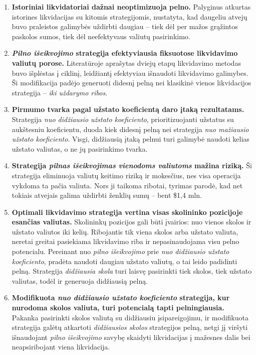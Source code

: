 \documentclass[]{VUMIFTemplateClass}
\begin{document}
\begin{enumerate}
  \item \textbf{Istoriniai likvidatoriai dažnai neoptimizuoja pelno.} Palyginus atkurtas istorines likvidacijas su kitomis strategijomis, nustatyta, kad daugeliu atvejų buvo praleistos galimybės uždirbti daugiau – tiek dėl per mažos grąžintos paskolos sumos, tiek dėl neefektyvaus valiutų pasirinkimo.

  \item \textbf{\textit{Pilno išeikvojimo} strategija efektyviausia fiksuotose likvidavimo valiutų porose.} Literatūroje aprašytas dviejų etapų likvidavimo metodas buvo išplėstas į ciklinį, leidžiantį efektyviau išnaudoti likvidavimo galimybes. Ši modifikacija padėjo generuoti didesnį pelną nei klasikinė vienos likvidacijos strategija – \textit{iki uždarymo ribos}.

  \item \textbf{Pirmumo tvarka pagal užstato koeficientą daro įtaką rezultatams.} Strategija \textit{nuo didžiausio užstato koeficiento}, prioritizuojanti užstatus su aukštesniu koeficientu, duoda kiek didesnį pelną nei strategija \textit{nuo mažiausio užstato koeficiento}. Visgi, didžiausią įtaką pelnui turi galimybė naudoti kelias užstato valiutas, o ne jų pasirinkimo tvarka.

  \item \textbf{Strategija \textit{pilnas išeikvojimas vienodoms valiutoms} mažina riziką.} Ši strategija eliminuoja valiutų keitimo riziką ir mokesčius, nes visa operacija vykdoma ta pačia valiuta. Nors ji taikoma ribotai, tyrimas parodė, kad net tokiais atvejais galima uždirbti ženklių sumų – bent \$1{,}4 mln.

  \item \textbf{Optimali likvidavimo strategija vertina visas skolininko pozicijoje esančias valiutas.} Skolininkų pozicijos gali būti įvairios: nuo vienos skolos ir užstato valiutos iki kelių. Ribojantis tik viena skolos arba užstato valiuta, neretai greitai pasiekiama likvidavimo riba ir nepasinaudojama visu pelno potencialu. Pereinant nuo \textit{pilno išeikvojimo} prie \textit{nuo didžiausio užstato koeficiento}, pradėta naudoti daugiau užstato valiutų, o tai leido padidinti pelną. Strategija \textit{didžiausia skola} turi laisvę pasirinkti tiek skolos, tiek užstato valiutas, todėl ir generuoja didžiausią pelną.

  \item \textbf{Modifikuota \textit{nuo didžiausio užstato koeficiento} strategija, kur nurodoma skolos valiuta, turi potencialą tapti pelningiausia.} Pakanka pasirinkti skolos valiutą su didžiausiu įsipareigojimu, ir modifikuota strategija galėtų atkartoti \textit{didžiausios skolos} strategijos pelną, netgi jį viršyti išnaudojant \textit{pilno išeikvojimo} savybę skaidyti likvidacijas į mažesnes dalis bei neapsiribojant viena likvidacija.


\end{enumerate}
\end{document}
